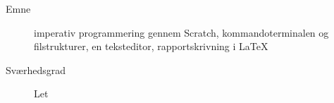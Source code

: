 \begin{description}
\item[Emne]  imperativ programmering gennem Scratch,
  kommandoterminalen og filstrukturer, en teksteditor, rapportskrivning i LaTeX
\item[Sværhedsgrad] Let
\end{description}
